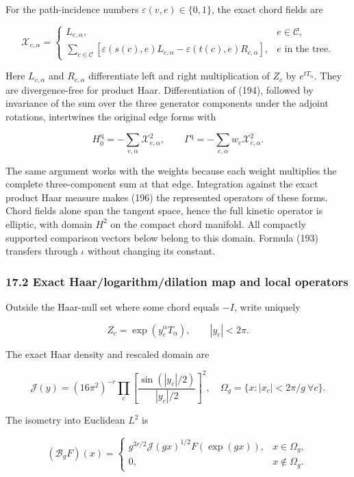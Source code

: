 \documentclass[
  11pt,
]{article}
\begin{document}
For the path-incidence numbers \(\varepsilon(v,e)\in\{0,1\}\), the exact
chord fields are

\[
 \mathcal X_{e,\alpha}=
 \begin{cases}
 L_{e,\alpha},&e\in\mathcal C,\\
 \displaystyle\sum_{c\in\mathcal C}
 [\varepsilon(s(c),e)L_{c,\alpha}
       -\varepsilon(t(c),e)R_{c,\alpha}],&e\text{ in the tree}.
 \end{cases}
\tag{195}
\]

Here \(L_{c,\alpha}\) and \(R_{c,\alpha}\) differentiate left and right
multiplication of \(Z_c\) by \(e^{tT_\alpha}\). They are divergence-free
for product Haar. Differentiation of (194), followed by invariance of
the sum over the three generator components under the adjoint rotations,
intertwines the original edge forms with

\[
 H_0^{\mathrm q}=-\sum_{e,\alpha}\mathcal X_{e,\alpha}^2,\qquad
 \Gamma^{\mathrm q}=-\sum_{e,\alpha}w_e\mathcal X_{e,\alpha}^2.
\tag{196}
\]

The same argument works with the weights because each weight multiplies
the complete three-component sum at that edge. Integration against the
exact product Haar measure makes (196) the represented operators of
these forms. Chord fields alone span the tangent space, hence the full
kinetic operator is elliptic, with domain \(H^2\) on the compact chord
manifold. All compactly supported comparison vectors below belong to
this domain. Formula (193) transfers through \(\iota\) without changing
its constant.

\subsubsection{17.2 Exact Haar/logarithm/dilation map and local
operators}\label{exact-haarlogarithmdilation-map-and-local-operators}

Outside the Haar-null set where some chord equals \(-I\), write uniquely

\[
 Z_c=\exp(y_c^\alpha T_\alpha),\qquad |y_c|<2\pi.
\]

The exact Haar density and rescaled domain are

\[
 \mathcal J(y)=(16\pi^2)^{-r}
       \prod_c\left[\frac{\sin(|y_c|/2)}{|y_c|/2}\right]^2,
 \quad \Omega_g=\{x:|x_c|<2\pi/g\ \forall c\}.
\]

The isometry into Euclidean \(L^2\) is

\[
 (\mathcal B_gF)(x)=
 \begin{cases}
 g^{3r/2}\mathcal J(gx)^{1/2}F(\exp(gx)),&x\in\Omega_g,\\
 0,&x\notin\Omega_g.
 \end{cases}
\tag{197}
\]
\end{document}
